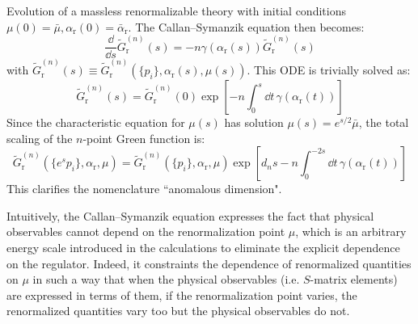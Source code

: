 \begin{example}{Evolution of a massless renormalizable theory}{}
  with initial conditions $ \mu(0) = \bar{\mu} , \alpha_\text{r}(0) = \bar{\alpha}_\text{r} $. The Callan--Symanzik equation then becomes:
  \begin{equation*}
    \frac{\dd}{\dd s} \tilde{G}_\text{r}^{(n)}(s) = - n \gamma(\alpha_\text{r}(s)) \tilde{G}_\text{r}^{(n)}(s)
  \end{equation*}
  with $ \tilde{G}_\text{r}^{(n)}(s) \equiv \tilde{G}_\text{r}^{(n)}(\{p_i\} , \alpha_\text{r}(s) , \mu(s)) $. This ODE is trivially solved as:
  \begin{equation*}
    \tilde{G}_\text{r}^{(n)}(s) = \tilde{G}_\text{r}^{(n)}(0) \exp \left[ -n \int_0^s \dd t \, \gamma(\alpha_\text{r}(t)) \right]
  \end{equation*}
  Since the characteristic equation for $ \mu(s) $ has solution $ \mu(s) = e^{s/2} \bar{\mu} $, the total scaling of the $ n $-point Green function is:
  \begin{equation}
    \tilde{G}_\text{r}^{(n)}(\{e^s p_i\} , \alpha_\text{r} , \mu) = \tilde{G}_\text{r}^{(n)}(\{p_i\} , \alpha_\text{r} , \mu) \exp \left[ d_n s - n \int_0^{-2s} \dd t \, \gamma(\alpha_\text{r}(t)) \right]
  \end{equation}
  This clarifies the nomenclature ``anomalous dimension".
\end{example}

Intuitively, the Callan--Symanzik equation expresses the fact that physical observables cannot depend on the renormalization point $ \mu $, which is an arbitrary energy scale introduced in the calculations to eliminate the explicit dependence on the regulator. Indeed, it constraints the dependence of renormalized quantities on $ \mu $ in such a way that when the physical observables (i.e. $ S $-matrix elements) are expressed in terms of them, if the renormalization point varies, the renormalized quantities vary too but the physical observables do not.











